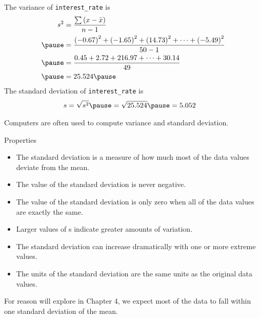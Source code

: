 \documentclass[handout]{beamer}
\begin{document}
\begin{frame}
\begin{example}
The variance of \texttt{interest\_rate} is
\begin{equation*}
\begin{aligned}
s^2 &= \dfrac{\sum \left(x-\bar{x}\right)}{n-1}\\\pause
&=  \dfrac{{(-0.67)}^2+{(-1.65)}^2+{(14.73)}^2+\cdots+{(-5.49)}^2}{50-1}  \\\pause
&= \dfrac{0.45+2.72+216.97+\cdots+30.14}{49} \\\pause
&= 25.524\pause
\end{aligned}
\end{equation*}
The standard deviation of \texttt{interest\_rate} is
\begin{equation*}
\begin{aligned}
s &= \sqrt{s^2} \pause = \sqrt{25.524} \pause = 5.052
\end{aligned}
\end{equation*}
\end{example}\pause
\begin{note}
Computers are often used to compute variance and standard deviation.
\end{note}
\end{frame}

\begin{frame}
\begin{block}{Properties}
\begin{itemize}[<+- | alert@+>]
\item The standard deviation is a measure of how much most of the data values deviate from the mean.
\item The value of the standard deviation is never negative.
\item The value of the standard deviation is only zero when all of the data values are exactly the same.
\item Larger values of s indicate greater amounts of variation.
\item The standard deviation can increase dramatically with one or more extreme values.
\item The units of the standard deviation are the same units as the original data values.
\end{itemize}
\end{block}
\onslide<+->
\begin{note}
For reason will explore in Chapter 4, we expect most of the data to fall within one standard deviation of the mean.
\end{note}
\end{frame}
\end{document}
